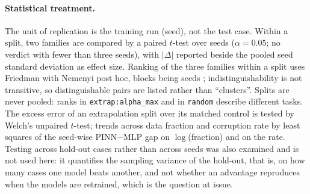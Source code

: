 \documentclass[subscriptcorrection,upint,varvw,barcolor=Goldenrod3,mathalfa=cal=euler,balance,hyphenate,french,pdf-a]{asmejour} %
\begin{document}
\paragraph{Statistical treatment.}
The unit of replication is the training run (seed), not the test case. Within a
split, two families are compared by a paired $t$-test over seeds ($\alpha=0.05$;
no verdict with fewer than three seeds), with $|\Delta|$ reported beside the pooled
seed standard deviation as effect size.
Ranking of the three families within a split uses Friedman with Nemenyi post hoc,
blocks being seeds \citep{demsar2006}; indistinguishability is not
transitive, so distinguishable pairs are listed rather than ``clusters''.
Splits are never pooled: ranks in \texttt{extrap:alpha\_max} and in
\texttt{random} describe different tasks.
The excess error of an extrapolation split over its matched control is tested by
Welch's unpaired $t$-test; trends across data fraction and corruption rate by
least squares of the seed-wise PINN$-$MLP gap on $\log$(fraction) and on the rate.
Testing across hold-out cases rather than across seeds was also examined and is not used here:
it quantifies the sampling variance of the hold-out, that is, on how many cases one model beats
another, and not whether an advantage reproduces when the models are retrained, which is the
question at issue.
\end{document}
